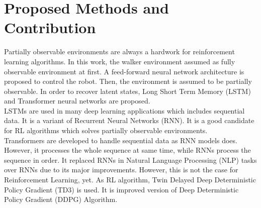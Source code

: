 \section{Proposed Methods and Contribution}
\label{sec:proposedmethods}
Partially observable environments are always a hardwork for reinforcement learning algorithms. In this work, the walker environment assumed as fully observable environment at first. A feed-forward neural network architecture is proposed to control the robot. Then, the environment is assumed to be partially observable. In order to recover latent states, Long Short Term Memory (LSTM) and Transformer neural networks are proposed. \\
LSTMs are used in many deep learning applications which includes sequential data. It is a variant of Recurrent Neural Networks (RNN). It is a good candidate for RL algorithms which solves partially observable environments. \\
Transformers are developed to handle sequential data as RNN models does. However, it processes the whole sequence at same time, while RNNs process the sequence in order. It replaced RNNs in Natural Language Processing (NLP) tasks over RNNs due to its major improvements. However, this is not the case for Reinforcement Learning, yet.
As RL algorithm, Twin Delayed Deep Deterministic Policy Gradient (TD3) is used. It is improved version of Deep Deterministic Policy Gradient (DDPG) Algorithm.

